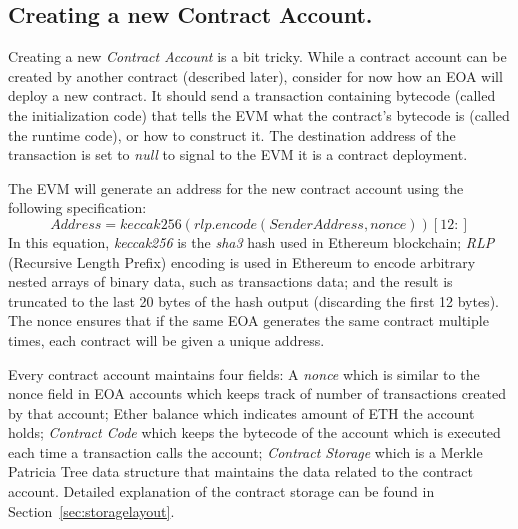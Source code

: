 \subsection{Creating a new Contract Account.}
Creating a new \textit{Contract Account} is a bit tricky. While a contract account can be created by another contract (described later), consider for now how an EOA will deploy a new contract. It should send a transaction containing bytecode (called the initialization code) that tells the EVM what the contract's bytecode is (called the runtime code), or how to construct it. The destination address of the transaction is set to \emph{null} to signal to the EVM it is a contract deployment. 

The EVM will generate an address for the new contract account using the following specification:
\begin{equation}
    \label{eqn:create}
    Address = keccak256(rlp.encode(Sender Address, nonce))[12:]
\end{equation}
In this equation, \textit{keccak256} is the \textit{sha3} hash used in Ethereum blockchain; \textit{RLP} (Recursive Length Prefix) encoding is used in Ethereum to encode arbitrary nested arrays of binary data, such as transactions data; and the result is truncated to the last 20 bytes of the hash output (discarding the first 12 bytes). The nonce ensures that if the same EOA generates the same contract multiple times, each contract will be given a unique address. 

Every contract account maintains four fields: A \textit{nonce} which is similar to the nonce field in EOA accounts which keeps track of number of transactions created by that account; Ether balance which indicates amount of ETH the account holds; \textit{Contract Code} which keeps the bytecode of the account which is executed each time a transaction calls the account; \textit{Contract Storage} which is a Merkle Patricia Tree data structure that maintains the data related to the contract account. Detailed explanation of the contract storage can be found in Section~\ref{sec:storagelayout}.

